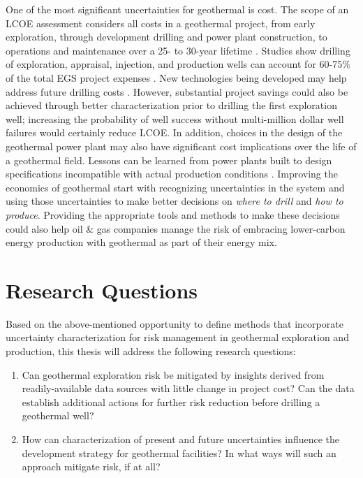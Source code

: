 One of the most significant uncertainties for geothermal is cost. The scope of an LCOE assessment considers all costs in a geothermal project, from early exploration, through development drilling and power plant construction, to operations and maintenance over a 25- to 30-year lifetime \citep{beckers_introducing_2013, entingh_volume_2006, tester_economic_1990}. Studies show drilling of exploration, appraisal, injection, and production wells can account for 60-75\% of the total EGS project expenses \citep{lukawski_uncertainty_2016, petty_synergies_2009}. New technologies being developed may help address future drilling costs \citep{nrel_2020_2020,lowry_geovision_2017}. However, substantial project savings could also be achieved through better characterization prior to drilling the first exploration well; increasing the probability of well success without multi-million dollar well failures would certainly reduce LCOE. In addition, choices in the design of the geothermal power plant may also have significant cost implications over the life of a geothermal field. Lessons can be learned from power plants built to design specifications incompatible with actual production conditions \citep[e.g.,][]{manente_hybrid_2011}. Improving the economics of geothermal start with recognizing uncertainties in the system and using those uncertainties to make better decisions on \textit{where to drill} and \textit{how to produce}. Providing the appropriate tools and methods to make these decisions could also help oil \& gas companies manage the risk of embracing lower-carbon energy production with geothermal as part of their energy mix.

\section{Research Questions}\label{ch1:researchqs}
Based on the above-mentioned opportunity to define methods that incorporate uncertainty characterization for risk management in geothermal exploration and production, this thesis will address the following research questions:

\begin{enumerate}
  \item Can geothermal exploration risk be mitigated by insights derived from readily-available data sources with little change in project cost? Can the data establish additional actions for further risk reduction before drilling a geothermal well? 
  \item How can characterization of present and future uncertainties influence the development strategy for geothermal facilities? In what ways will such an approach mitigate risk, if at all?
\end{enumerate}

